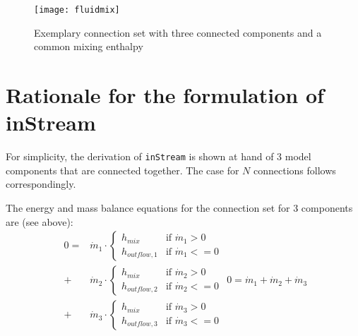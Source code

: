 \begin{figure}[H]
\caption{Exemplary connection set with three connected components and a common mixing enthalpy}
\begin{center}
\texttt{[image: fluidmix]}
\end{center}
\end{figure}

\section{Rationale for the formulation of inStream}\label{rationale-for-the-formulation-of-the-instream-operator}

For simplicity, the derivation of \lstinline!inStream! is shown at hand of 3 model components that are connected together.
The case for $N$ connections follows correspondingly.

The energy and mass balance equations for the connection set for 3
components are (see above):
\begin{subequations}
\begin{equation}
\begin{split}
0=&\dot{m}_1\cdot
\begin{cases}
h_{mix}&\text{if $\dot{m}_1>0$}\\
h_{outflow,1}&\text{if $\dot{m}_1<=0$}
\end{cases}\\
+&\dot{m}_2\cdot
\begin{cases}
h_{mix}&\text{if $\dot{m}_2>0$}\\
h_{outflow,2}&\text{if $\dot{m}_2<=0$}
\end{cases}\\
+&\dot{m}_3\cdot
\begin{cases}
h_{mix}&\text{if $\dot{m}_3>0$}\\
h_{outflow,3}&\text{if $\dot{m}_3<=0$}
\end{cases}
\end{split}
\label{eq:D1a}
\end{equation}
\begin{equation}
0=\dot{m}_1+\dot{m}_2+\dot{m}_3
\label{eq:D1b}
\end{equation}
\label{eq:D1}
\end{subequations}

